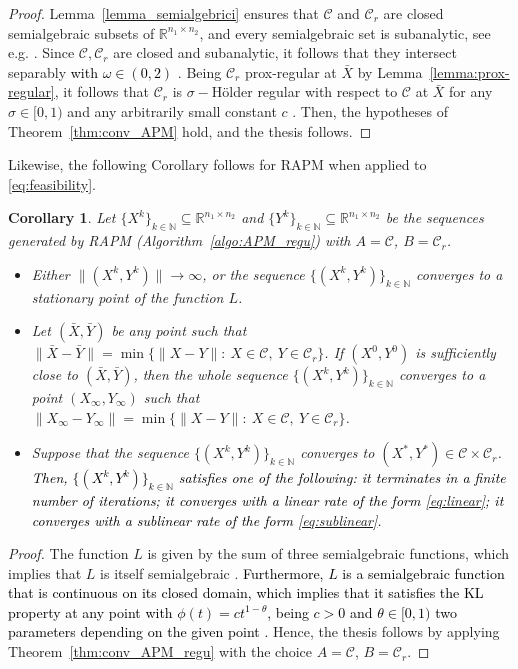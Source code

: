 \documentclass[pdflatex,sn-mathphys-num]{sn-jnl}
\numberwithin{equation}{section}%
\def\R{\mathbb{R}}
\def\N{\mathbb{N}}
\newcommand{\setRank}{{\mathcal{C}_r}}
\newcommand{\setNorm}{{\mathcal{C} }}
\newcommand{\REV}[1]{\textcolor{black}{#1}}
\theoremstyle{thmstyleone}%
\newtheorem{corollary}[theorem]{Corollary}%
\theoremstyle{thmstyletwo}%
\theoremstyle{thmstylethree}%
\begin{document}
\begin{proof}
{Lemma~\ref{lemma_semialgebrici} ensures that  $\setNorm$ and $\setRank$ are closed semialgebraic subsets of $\R^{n_1\times n_2}$, and every semialgebraic set is subanalytic, see e.g. \cite[p. 1208]{Bolte2007}. Since $\setNorm,\setRank$ are closed and subanalytic, it follows that they intersect separably \REV{with $\omega\in (0,2)$} \cite[Theorem 3]{Noll-etal-2016}.} Being $\setRank$ prox-regular at $\bar{X}$ by Lemma~\ref{lemma:prox-regular}, it follows that $\setRank$ is $\sigma-$H\"older regular with respect to $\setNorm$ at $\bar{X}$ for any $\sigma\in[0,1)$ and any arbitrarily small constant $c$ \cite[Corollary 3]{Noll-etal-2016}. Then, the hypotheses of Theorem~\ref{thm:conv_APM} hold, and the thesis follows.
\end{proof}

Likewise, the following Corollary follows for RAPM when applied to \eqref{eq:feasibility}.

\begin{corollary}\label{th:RAPM_MC}
    Let $\{X^k\}_{k\in\mathbb{N}}\subseteq \R^{n_1\times n_2}$ and $\{Y^k\}_{k\in\mathbb{N}}\subseteq \R^{n_1\times n_2}$ be the sequences generated by RAPM (Algorithm~\ref{algo:APM_regu}) with $A=\setNorm$, $B=\setRank$.
    \begin{itemize}
        \item[(i)] Either $\|(X^k,Y^k)\|\rightarrow \infty$, or the sequence $\{(X^k,Y^k)\}_{k\in\mathbb{N}}$ converges to a stationary point of the function $L$.
        \item[(ii)] Let $(\bar{X},\bar{Y})$ be any point such that $\|\bar{X}-\bar{Y}\|=\min\{\|X-Y\|: \ X\in \setNorm, \ Y\in \setRank\}$. If $(X^0,Y^0)$ is sufficiently close to $(\bar{X},\bar{Y})$, then the whole sequence $\{(X^k,Y^k)\}_{k\in\mathbb{N}}$ converges to a point $(X_{\infty},Y_{\infty})$ such that $\|X_{\infty}-Y_{\infty}\| =\min\{\|X-Y\|: \ X\in \setNorm, \ Y\in \setRank\}$.
        \item[(iii)]{Suppose that the sequence $\{(X^k,Y^k)\}_{k\in\N}$ converges to $(X^*,Y^*)\in \setNorm \times \setRank$. \REV{Then, $\{(X^k,Y^k)\}_{k\in\N}$ satisfies one of the following: it terminates in a finite number of iterations; it converges with a linear rate of the form \eqref{eq:linear}; it converges with a sublinear rate of the form \eqref{eq:sublinear}.}}
    \end{itemize}
\end{corollary}

\begin{proof}
The function $L$ is given by the sum of three semialgebraic functions, which implies that $L$ is itself semialgebraic \cite[Example 2]{Bolte-etal-2014}. \REV{Furthermore, $L$ is a semialgebraic function that is continuous on its closed domain, which implies that it satisfies the KL property at any point with $\phi(t)=ct^{1-\theta}$, being $c>0$ and $\theta\in[0,1)$ two parameters depending on the given point \cite[Theorem 3.1]{Bolte2007}.} Hence, the thesis follows by applying Theorem~\ref{thm:conv_APM_regu} with the choice $A=\setNorm$, $B=\setRank$.
\end{proof}
\end{document}
